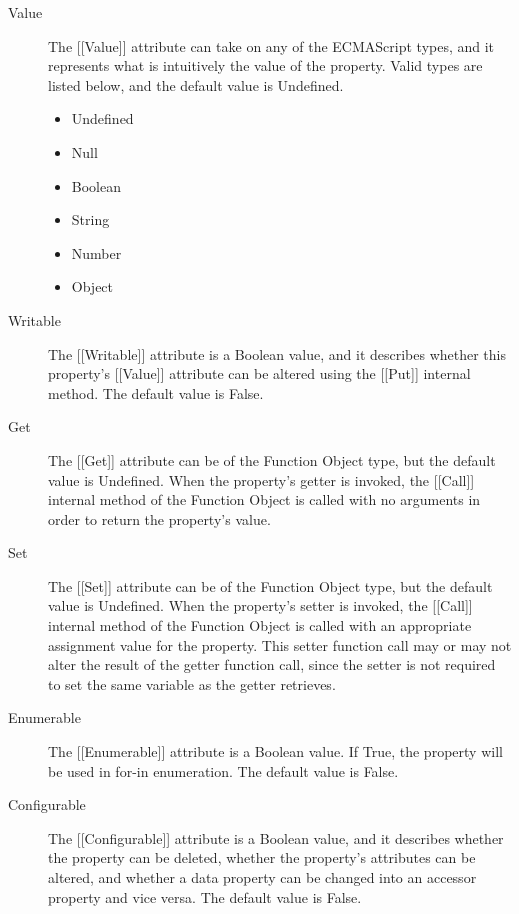 \documentclass[a4paper,11pt,twoside]{report}
\begin{document}
\begin{description}
\item[Value] The [[Value]] attribute can take on any of the ECMAScript types, and it represents what is intuitively the value of the property. Valid types are listed below, and the default value is Undefined.
\begin{multicols}{2}
\begin{itemize}
	\item Undefined
	\item Null
	\item Boolean
	\item String
	\item Number
	\item Object
\end{itemize}
\end{multicols}

\item[Writable] The [[Writable]] attribute is a Boolean value, and it describes whether this property's [[Value]] attribute can be altered using the [[Put]] internal method. The default value is False.

\item[Get] The [[Get]] attribute can be of the Function Object type, but the default value is Undefined. When the property's getter is invoked, the [[Call]] internal method of the Function Object is called with no arguments in order to return the property's value.

\item[Set] The [[Set]] attribute can be of the Function Object type, but the default value is Undefined. When the property's setter is invoked, the [[Call]] internal method of the Function Object is called with an appropriate assignment value for the property. This setter function call may or may not alter the result of the getter function call, since the setter is not required to set the same variable as the getter retrieves.

\item[Enumerable] The [[Enumerable]] attribute is a Boolean value. If True, the property will be used in for-in enumeration. The default value is False.

\item[Configurable] The [[Configurable]] attribute is a Boolean value, and it describes whether the property can be deleted, whether the property's attributes can be altered, and whether a data property can be changed into an accessor property and vice versa. The default value is False.
\end{description}
\end{document}
